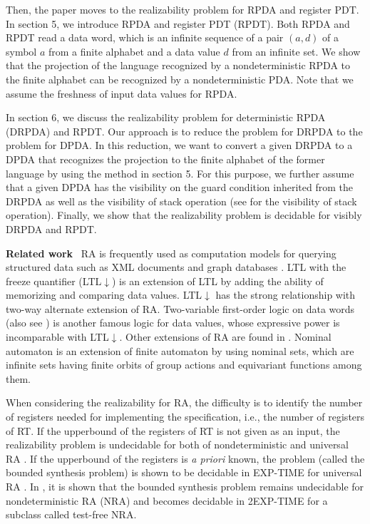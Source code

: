 Then, the paper moves to the realizability problem for RPDA and register PDT.
In section 5, we introduce RPDA and register PDT (RPDT).
Both RPDA and RPDT read a data word, which is an infinite sequence of
a pair $(a,d)$ of a symbol $a$ from a finite alphabet and a data value $d$ from
an infinite set.
We show that the projection of the language recognized by a nondeterministic RPDA
to the finite alphabet can be recognized by a nondeterministic PDA.
Note that we assume the freshness of input data values \cite{Tz10} for RPDA.

In section 6, we discuss the realizability problem for deterministic RPDA (DRPDA) and RPDT.
Our approach is to reduce the problem for DRPDA to the problem for DPDA.
In this reduction, we want to convert a given DRPDA to a DPDA that recognizes
the projection to the finite alphabet of the former language by using the method
in section 5.
For this purpose, we further assume that a given DPDA has the visibility
on the guard condition inherited from the DRPDA as well as the visibility
of stack operation (see \cite{AM04} for the visibility of stack operation).
Finally, we show that the realizability problem is decidable for visibly DRPDA and RPDT.
\medskip\par\noindent
{\bf Related work}~
RA is frequently used as
computation models for querying structured data such as XML documents
and graph databases \cite{LV12,LTV15}.
LTL with the freeze quantifier (LTL$\downarrow$) \cite{DL09,DLN07} is
an extension of LTL by adding the ability of memorizing and comparing data values.
LTL$\downarrow$ has the strong relationship with two-way alternate extension of RA.
Two-variable first-order logic on data words \cite{BDMSS11}(also see \cite{Bo02})
is another famous logic for data values,
whose expressive power is incomparable with LTL$\downarrow$.
Other extensions of RA are found in \cite{BKL14,CLTW17,DFSS19,BCGK12}.
Nominal automaton \cite{BKL14} is an extension of finite automaton
by using nominal sets, which are infinite sets having finite orbits
of group actions and equivariant functions among them.

When considering the realizability for RA,
the difficulty is to identify the number of registers
needed for implementing the specification, i.e., the number of registers of RT.
If the upperbound of the registers of RT is not given as an input,
the realizability problem is undecidable for both of nondeterministic and
universal RA \cite{EFR19}.
If the upperbound of the registers is {\em a priori} known,
the problem (called the bounded synthesis
problem) is shown to be decidable in EXP-TIME for universal RA \cite{KK19}.
In \cite{EFR19}, it is shown that the bounded synthesis problem remains undecidable
for nondeterministic RA (NRA) \cite{EFR19}
and becomes decidable in 2EXP-TIME for a subclass called test-free NRA.

